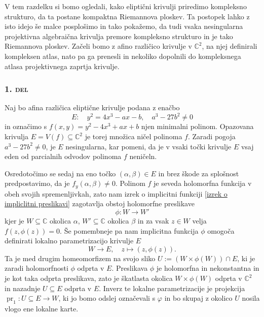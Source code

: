 \documentclass[mat1]{fmfdelo}
\numberwithin{equation}{section}
\newcommand{\C}{\mathbb C}
\DeclareMathOperator{\pr}{pr}
\theoremstyle{definition}
\begin{document}
V tem razdelku si bomo ogledali, kako eliptični krivulji 
priredimo kompleksno strukturo, da ta postane kompaktna Riemannova ploskev. Ta postopek lahko z isto idejo še malce posplošimo in tako pokažemo, da tudi vsaka nesingularna projektivna algebraična krivulja premore kompleksno strukturo in je tako Riemannova ploskev.   
Začeli bomo z afino različico krivulje v $\C^2$, na njej definirali kompleksen atlas, nato pa ga prenesli in nekoliko dopolnili do kompleksnega atlasa projektivnega zaprtja krivulje.


\subsubsection*{\textsc{1. del}}
Naj bo afina različica eliptične krivulje podana z enačbo
\[
    E: \quad y^2 = 4x^3 - ax - b, \quad a^3 - 27b^2 \neq 0
\]
in označimo s $f(x,y) = y^2 - 4x^3 + ax + b$ njen minimalni polinom. Opazovana krivulja $E = V(f) \subseteq \C^2$ je torej množica ničel polinoma $f$. Zaradi pogoja $a^3 - 27b^2 \neq 0$, je $E$ nesingularna, kar pomeni, da je v vsaki točki krivulje $E$ vsaj eden od parcialnih odvodov polinoma $f$ neničeln. 

Osredotočimo se sedaj na eno točko $(\alpha, \beta) \in E$ in brez škode za splošnost predpostavimo, da je $f_y(\alpha, \beta) \neq 0$. Polinom $f$ je seveda holomorfna funkcija v obeh svojih spremenljivkah, zato nam izrek o implicitni funkciji \ref{izrek o impliclitni preslikavi} zagotavlja obstoj holomorfne preslikave 
\[
    \phi : W \to W'  
\]
kjer je $W \subseteq \C$ okolica $\alpha$, $W' \subseteq \C$ okolica $\beta$ in za vsak $z \in W$ velja $f(z, \phi(z)) = 0$. Še pomembneje pa nam implicitna funkcija $\phi$ omogoča definirati lokalno parametrizacijo krivulje $E$
\[
    W \to E, \quad z \mapsto (z, \phi(z)).
\] 
Ta je med drugim homeomorfizem na svojo sliko $U := (W \times \phi(W)) \cap E$, ki je zaradi holomorfnosti $\phi$ odprta v $E$. Preslikava $\phi$ je holomorfna in nekonstantna in je kot taka odprta preslikava, zato je škatlasta okolica $W \times \phi(W)$ odprta v $\C^2$ in nazadnje $U \subseteq E$ odprta v $E$. Inverz te lokalne parametrizacije je projekcija $\pr_1 : U \subseteq E \to W$, ki jo bomo odslej označevali s $\varphi$ in bo skupaj z okolico $U$ nosila vlogo ene lokalne karte. 
\end{document}
